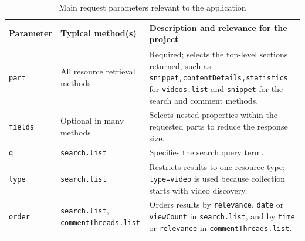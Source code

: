 \begingroup
{}
\begin{table}[htbp]
    \centering
    \footnotesize
    \caption{Main request parameters relevant to the application}
    \label{tab:youtube_api_parameters}
    \begin{tabularx}
        {\textwidth}{>{\raggedright\arraybackslash}p{2.6cm}>{\raggedright\arraybackslash}p{3.3cm}X}
        \toprule
        \textbf{Parameter}                                                        & \textbf{Typical method(s)}                                                   & \textbf{Description and relevance for the project}                                                                                                                                                     \\
        \midrule
        \texttt{part}                                                             & All resource retrieval methods                                               & Required; selects the top-level sections returned, such as \texttt{snippet,contentDetails,statistics} for \texttt{videos.\allowbreak list} and \texttt{snippet} for the search and comment methods.    \\
        \midrule
        \texttt{fields}                                                           & Optional in many methods                                                     & Selects nested properties within the requested parts to reduce the response size.                                                                                                                      \\
        \midrule
        \texttt{q}                                                                & \texttt{search.\allowbreak list}                                             & Specifies the search query term.                                                                                                                                                                       \\
        \midrule
        \texttt{type}                                                             & \texttt{search.\allowbreak list}                                             & Restricts results to one resource type; \texttt{type=video} is used because collection starts with video discovery.                                                                                    \\
        \midrule
        \texttt{order}                                                            & \texttt{search.\allowbreak list}, \texttt{commentThreads.\allowbreak list}   & Orders results by \texttt{relevance}, \texttt{date} or \texttt{viewCount} in \texttt{search.\allowbreak list}, and by \texttt{time} or \texttt{relevance} in \texttt{commentThreads.\allowbreak list}. \\

\end{tabularx}
\end{table}
